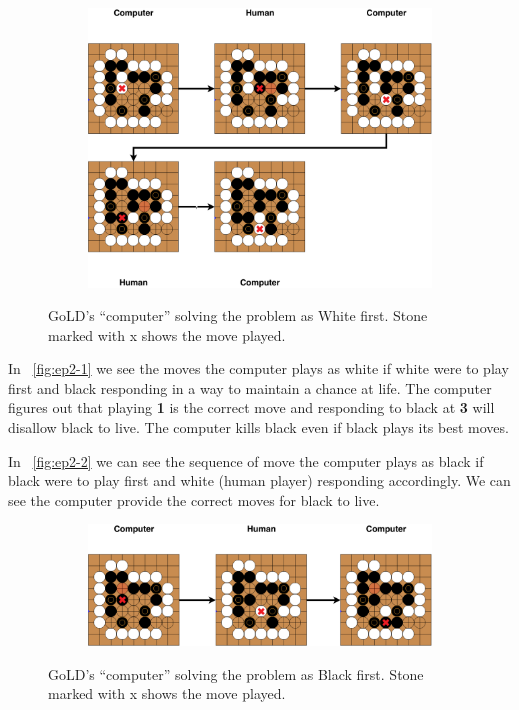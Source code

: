 \documentclass{l4proj}
\newcommand{\bo}[1]{\textbf{#1}}
\begin{document}
\begin{figure}[!ht]
\centering
\begin{subfigure}[b]{0.8\textwidth}
\includegraphics[width=\textwidth]{ep2/ep2-1.pdf}
\end{subfigure}
\caption{ GoLD’s “computer” solving the problem as White first. Stone marked with x shows the move played.}
\label{fig:ep2-1}
\end{figure}


In ~\autoref{fig:ep2-1} we see the moves the computer plays as white if white were to play first and black responding in a way to maintain a chance at life. The computer figures out that playing \bo{1} is the correct move and responding to black at \bo{3} will disallow black to live. The computer kills black even if black plays its best moves.

In ~\autoref{fig:ep2-2} we can see the sequence of move the computer plays as black if black were to play first and white (human player) responding accordingly. We can see the computer provide the correct moves for black to live.

\begin{figure}[!ht]
\centering
\begin{subfigure}[b]{\textwidth}
\includegraphics[width=\textwidth]{ep2/ep2-2.pdf}
\end{subfigure}
\caption{ GoLD’s “computer” solving the problem as Black first. Stone marked with x shows the move played.}
\label{fig:ep2-2}
\end{figure}
\end{document}
